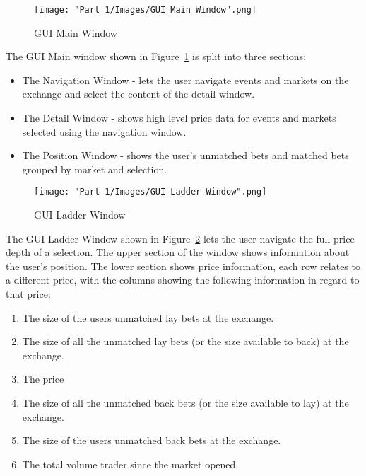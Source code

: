 		\begin{figure}[H]
			\centering
			\texttt{[image: "Part 1/Images/GUI Main Window".png]}
			\caption{GUI Main Window}
    			\label{fig:guiMainWindow}
		\end{figure}	

	The GUI Main window shown in Figure~\ref{fig:guiMainWindow} is split into three sections:
		
	\begin{itemize}
		\item The Navigation Window - lets the user navigate events and markets on the exchange and select the content of the detail window.
		\item The Detail Window - shows high level price data for events and markets selected using the navigation window.
		\item The Position Window - shows the user's unmatched bets and matched bets grouped by market and selection.
	\end{itemize}

		\begin{figure}[H]
			\centering
			\texttt{[image: "Part 1/Images/GUI Ladder Window".png]}
			\caption{GUI Ladder Window}
    			\label{fig:guiLadderWindow}
		\end{figure}	
	
	The GUI Ladder Window shown in Figure~\ref{fig:guiLadderWindow} lets the user navigate the full price depth of a selection. The upper section of the window shows information about the user's position. The lower section shows price information, each row relates to a different price, with the columns showing the following information in regard to that price:
	
	\begin{enumerate}
		\item The size of the users unmatched lay bets at the exchange.
		\item The size of all the unmatched lay bets (or the size available to back) at the exchange.
		\item The price
		\item The size of all the unmatched back bets (or the size available to lay) at the exchange.
		\item The size of the users unmatched back bets at the exchange.
		\item The total volume trader since the market opened.
	\end{enumerate}
		
